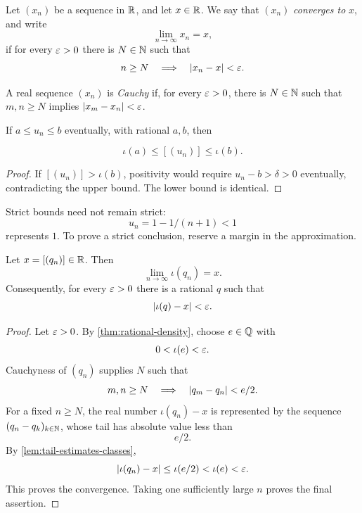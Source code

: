 \begin{definition}
Let $(x_n)$ be a sequence in $\mathbb{R}$, and let $x\in\mathbb{R}$. We say that $(x_n)$ \emph{converges to} $x$, and write
\[
\lim_{n\to\infty}x_n=x,
\]
if for every $\varepsilon>0$ there is $N\in\mathbb{N}$ such that
\[
n\geq N\quad\Longrightarrow\quad \lvert x_n-x\rvert<\varepsilon.
\]
\end{definition}

\begin{definition}
A real sequence $(x_n)$ is \emph{Cauchy} if, for every $\varepsilon>0$, there is $N\in\mathbb{N}$ such that $m,n\geq N$ implies $\lvert x_m-x_n\rvert<\varepsilon$.
\end{definition}

\begin{lemma}
\label{lem:tail-estimates-classes}
If $a\leq u_n\leq b$ eventually, with rational $a,b$, then

\[
\iota(a)\leq[(u_n)]\leq\iota(b).
\]

\end{lemma}
\begin{proof}
If $[(u_n)]>\iota(b)$, positivity would require $u_n-b>\delta>0$
eventually, contradicting the upper bound. The lower bound is identical.
\end{proof}
Strict bounds need not remain strict:
\[
u_n=1-1/(n+1)<1
\]
 represents $1$.
To prove a strict conclusion, reserve a margin in the approximation.

\begin{lemma}
\label{lem:rational-representatives-converge}
Let $x=[(q_n)]\in\mathbb{R}$. Then
\[
\lim_{n\to\infty}\iota(q_n)=x.
\]
Consequently, for every $\varepsilon>0$ there is a rational $q$ such that
\[
\lvert \iota(q)-x\rvert<\varepsilon.
\]
\end{lemma}
\begin{proof}
Let $\varepsilon>0$. By \cref{thm:rational-density}, choose $e\in\mathbb{Q}$ with
\[
0<\iota(e)<\varepsilon.
\]
Cauchyness of $(q_n)$ supplies $N$ such that
\[
m,n\geq N\quad\Longrightarrow\quad\lvert q_m-q_n\rvert<e/2.
\]
For a fixed $n\geq N$, the real number $\iota(q_n)-x$ is represented by the sequence $(q_n-q_k)_{k\in\mathbb{N}}$, whose tail has absolute value less than
\[
e/2.
\]
 By \cref{lem:tail-estimates-classes},
\[
\lvert \iota(q_n)-x\rvert\leq\iota(e/2)<\iota(e)<\varepsilon.
\]
This proves the convergence. Taking one sufficiently large $n$ proves the final assertion.
\end{proof}


